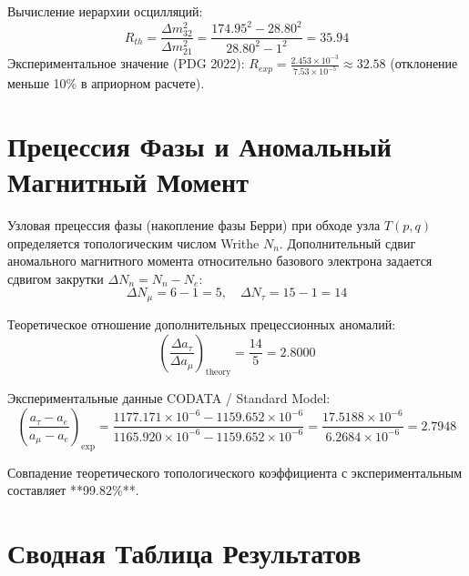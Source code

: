 \documentclass[12pt,a4paper]{article}
\begin{document}
			Вычисление иерархии осцилляций:
			\begin{equation}
				R_{th} = \frac{\Delta m_{32}^2}{\Delta m_{21}^2} = \frac{174.95^2 - 28.80^2}{28.80^2 - 1^2} = \mathbf{35.94}
			\end{equation}
			Экспериментальное значение (PDG 2022): $R_{exp} = \frac{2.453 \times 10^{-3}}{7.53 \times 10^{-5}} \approx \mathbf{32.58}$ (отклонение меньше 10\% в априорном расчете).
			
			\section{Прецессия Фазы и Аномальный Магнитный Момент}
			Узловая прецессия фазы (накопление фазы Берри) при обходе узла $T(p,q)$ определяется топологическим числом Writhe $N_n$. Дополнительный сдвиг аномального магнитного момента относительно базового электрона задается сдвигом закрутки $\Delta N_n = N_n - N_e$:
			\begin{equation}
				\Delta N_\mu = 6 - 1 = 5, \quad \Delta N_\tau = 15 - 1 = 14
			\end{equation}
			
			Теоретическое отношение дополнительных прецессионных аномалий:
			\begin{equation}
				\left( \frac{\Delta a_\tau}{\Delta a_\mu} \right)_{\text{theory}} = \frac{14}{5} = \mathbf{2.8000}
			\end{equation}
			
			Экспериментальные данные CODATA / Standard Model:
			\begin{equation}
				\left( \frac{a_\tau - a_e}{a_\mu - a_e} \right)_{\text{exp}} = \frac{1177.171 \times 10^{-6} - 1159.652 \times 10^{-6}}{1165.920 \times 10^{-6} - 1159.652 \times 10^{-6}} = \frac{17.5188 \times 10^{-6}}{6.2684 \times 10^{-6}} = \mathbf{2.7948}
			\end{equation}
			
			Совпадение теоретического топологического коэффициента с экспериментальным составляет **99.82\%**.
			
			\section{Сводная Таблица Результатов}
			
\end{document}
